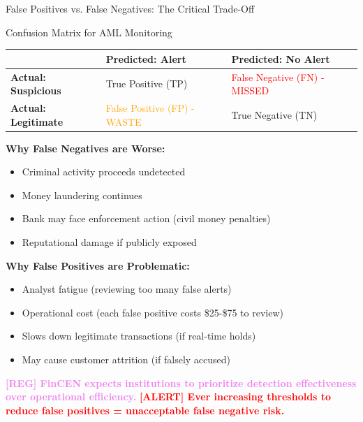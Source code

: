 \documentclass[11pt,a4paper]{beamer}
\newcommand{\redflag}[1]{\textcolor{red}{\textbf{[ALERT] #1}}}
\newcommand{\regcite}[1]{\textcolor{violet}{\textbf{[REG] #1}}}
\begin{document}
\begin{frame}{False Positives vs. False Negatives: The Critical Trade-Off}
	\begin{block}{Confusion Matrix for AML Monitoring}
		\centering
		\begin{tabular}{p{}|p{}|p{}}
			\hline
			\rowcolor{lightgray}
			& \textbf{Predicted: Alert} & \textbf{Predicted: No Alert} \\
			\hline
			\textbf{Actual: Suspicious} & True Positive (TP) & \textcolor{red}{False Negative (FN) - MISSED} \\
			\hline
			\textbf{Actual: Legitimate} & \textcolor{orange}{False Positive (FP) - WASTE} & True Negative (TN) \\
			\hline
		\end{tabular}
	\end{block}
	\textbf{Why False Negatives are Worse:}
	\begin{itemize}
		\item Criminal activity proceeds undetected
		\item Money laundering continues
		\item Bank may face enforcement action (civil money penalties)
		\item Reputational damage if publicly exposed
	\end{itemize}
	\textbf{Why False Positives are Problematic:}
	\begin{itemize}
		\item Analyst fatigue (reviewing too many false alerts)
		\item Operational cost (each false positive costs \$25-\$75 to review)
		\item Slows down legitimate transactions (if real-time holds)
		\item May cause customer attrition (if falsely accused)
	\end{itemize}
	\regcite{FinCEN expects institutions to prioritize detection effectiveness over operational efficiency.}
	\redflag{Ever increasing thresholds to reduce false positives = unacceptable false negative risk.}
\end{frame}
\end{document}
